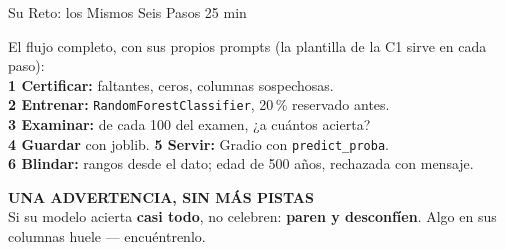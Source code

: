 \documentclass[aspectratio=169, 11pt]{beamer}
\begin{document}
\begin{frame}[shrink=5]{\faTools\hspace{4pt}Su Reto: los Mismos Seis Pasos \hfill {\normalsize\color{arcaRed}\faClock\hspace{4pt}25 min}}
  \vspace{-2pt}
  \begin{encargo}
    {\scriptsize\color{textMuted}
     El flujo completo, con sus propios prompts (la plantilla de la C1
     sirve en cada paso):\\[2pt]
     \textbf{1 Certificar:} faltantes, ceros, columnas sospechosas.\\[1pt]
     \textbf{2 Entrenar:} \texttt{RandomForestClassifier}, 20\,\%
     reservado antes.\\[1pt]
     \textbf{3 Examinar:} de cada 100 del examen, ¿a cuántos acierta?\\[1pt]
     \textbf{4 Guardar} con joblib.\quad
     \textbf{5 Servir:} Gradio con \texttt{predict\_proba}.\\[1pt]
     \textbf{6 Blindar:} rangos desde el dato; edad de 500 años, rechazada
     con mensaje.}
  \end{encargo}
  \vspace{2pt}
  \begin{tcolorbox}[colback=arcaGray, colframe=arcaRed, boxrule=0pt,
    leftrule=3pt, arc=3pt, left=8pt, right=8pt, top=3pt, bottom=3pt]
    {\scriptsize\color{arcaRed}\bfseries UNA ADVERTENCIA, SIN MÁS PISTAS}\\[2pt]
    {\scriptsize\color{textMuted}
     Si su modelo acierta \textbf{casi todo}, no celebren: \textbf{paren y
     desconfíen}. Algo en sus columnas huele --- encuéntrenlo.}
  \end{tcolorbox}
\end{frame}
\end{document}
